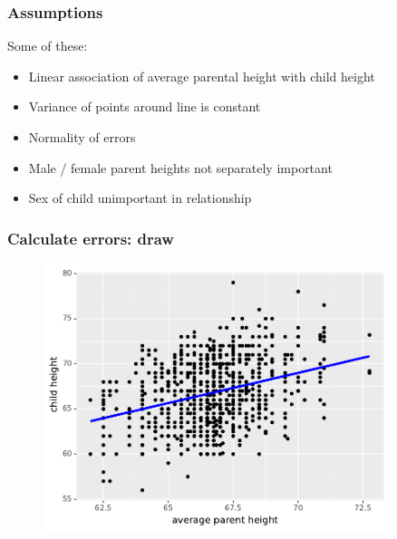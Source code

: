 \documentclass[handout]{beamer}
\begin{document}
\begin{frame}
	\frametitle{Assumptions}
	
	Some of these:
	\begin{itemize}
		\item Linear association of average parental height with child height
		\item Variance of points around line is constant
		\item Normality of errors
		\item Male / female parent heights not separately important
		\item Sex of child unimportant in relationship
		\end{itemize}

\end{frame}

\begin{frame}
	\frametitle{Calculate errors: draw}
	
	\begin{figure}[ht]
		\centerline{\includegraphics[width=0.9\textwidth]{../figures/galton_fit_sse.pdf}}
	\end{figure}
	
\end{frame}
\end{document}
